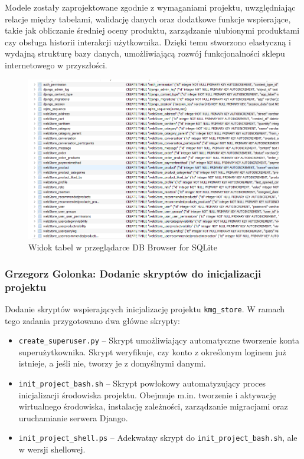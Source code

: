 \documentclass[12pt,a4paper,oneside]{article}
\theoremstyle{definition}
\numberwithin{equation}{section}
\begin{document}
Modele zostały zaprojektowane zgodnie z wymaganiami projektu, uwzględniając relacje między tabelami, 
walidację danych oraz dodatkowe funkcje wspierające, takie jak obliczanie średniej oceny produktu, 
zarządzanie ulubionymi produktami czy obsługa historii interakcji użytkownika. 
Dzięki temu stworzono elastyczną i wydajną strukturę bazy danych, 
umożliwiającą rozwój funkcjonalności sklepu internetowego w przyszłości.

\begin{figure}[H]
    \centering
    \includegraphics[width=0.9\columnwidth]{images/krzysztofBImages/modele_bazodanowe.png}
    \caption{Widok tabel w przeglądarce DB Browser for SQLite}
    \label{fig:db_models}
\end{figure}


% 
% 
\subsubsection{Grzegorz Golonka: Dodanie skryptów do inicjalizacji projektu}
\label{section:1.3.19}
Dodanie skryptów wspierających inicjalizację projektu \texttt{kmg\_store}. W ramach tego zadania przygotowano dwa główne skrypty:

\begin{itemize}
    \item \texttt{create\_superuser.py} – Skrypt umożliwiający automatyczne tworzenie konta superużytkownika. Skrypt weryfikuje, czy konto z określonym loginem już istnieje, a jeśli nie, tworzy je z domyślnymi danymi.
    \item \texttt{init\_project\_bash.sh} – Skrypt powłokowy automatyzujący proces inicjalizacji środowiska projektu. Obejmuje m.in. tworzenie i aktywację wirtualnego środowiska, instalację zależności, zarządzanie migracjami oraz uruchamianie serwera Django.
    \item \texttt{init\_project\_shell.ps} – Adekwatny skrypt do \texttt{init\_project\_bash.sh}, ale w wersji shellowej.
\end{itemize}
\end{document}
